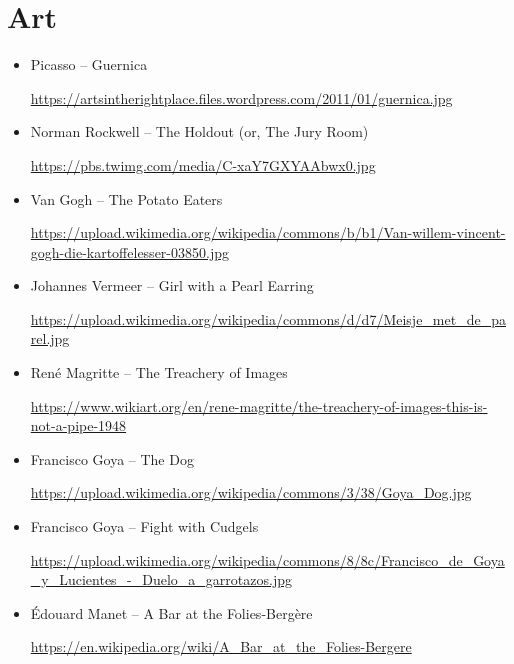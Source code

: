 \documentclass[12pt, openany, letterpaper]{memoir}
\begin{document}
\chapter{Art}
\begin{itemize}
	\item Picasso -- Guernica
	
	\hyperref[https://artsintherightplace.files.wordpress.com/2011/01/guernica.jpg]{https://artsintherightplace.files.wordpress.com/2011/01/guernica.jpg}
	
	\item Norman Rockwell -- The Holdout (or, The Jury Room)
	
	\hyperref[https://pbs.twimg.com/media/C-xaY7GXYAAbwx0.jpg]{https://pbs.twimg.com/media/C-xaY7GXYAAbwx0.jpg}
	
	\item Van Gogh -- The Potato Eaters
	
	\hyperref[https://upload.wikimedia.org/wikipedia/commons/b/b1/Van-willem-vincent-gogh-die-kartoffelesser-03850.jpg]{https://upload.wikimedia.org/wikipedia/commons/b/b1/Van-willem-vincent-gogh-die-kartoffelesser-03850.jpg}
	
	\item Johannes Vermeer -- Girl with a Pearl Earring
	
	\hyperref[https://upload.wikimedia.org/wikipedia/commons/d/d7/Meisje_met_de_parel.jpg]{https://upload.wikimedia.org/wikipedia/commons/d/d7/Meisje\_met\_de\_parel.jpg}
	
	\item René Magritte -- The Treachery of Images
	
	\hyperref[https://www.wikiart.org/en/rene-magritte/the-treachery-of-images-this-is-not-a-pipe-1948]{https://www.wikiart.org/en/rene-magritte/the-treachery-of-images-this-is-not-a-pipe-1948}
	
	\item Francisco Goya -- The Dog
	
	\hyperref[https://upload.wikimedia.org/wikipedia/commons/3/38/Goya_Dog.jpg]{https://upload.wikimedia.org/wikipedia/commons/3/38/Goya\_Dog.jpg}
	
	\item Francisco Goya -- Fight with Cudgels
	
	\hyperref[https://upload.wikimedia.org/wikipedia/commons/8/8c/Francisco_de_Goya_y_Lucientes_-_Duelo_a_garrotazos.jpg]{https://upload.wikimedia.org/wikipedia/commons/8/8c/Francisco\_de\_Goya\_y\_Lucientes\_-\_Duelo\_a\_garrotazos.jpg}
	
	\item Édouard Manet -- A Bar at the Folies-Bergère
	
	\hyperref[https://en.wikipedia.org/wiki/A_Bar_at_the_Folies-Bergere]{https://en.wikipedia.org/wiki/A\_Bar\_at\_the\_Folies-Bergere}
\end{itemize}
\end{document}
